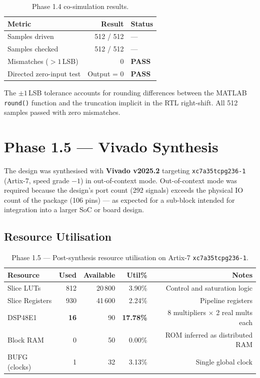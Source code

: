 \documentclass[11pt,a4paper]{article}
\begin{document}
\begin{table}[H]
\centering
\begin{tabular}{lrl}
\toprule
\textbf{Metric} & \textbf{Result} & \textbf{Status} \\
\midrule
Samples driven          & 512 / 512  & --- \\
Samples checked         & 512 / 512  & --- \\
Mismatches ($>1$\,LSB)  & 0          & \textcolor{passgreen}{\textbf{PASS}} \\
Directed zero-input test & Output = 0 & \textcolor{passgreen}{\textbf{PASS}} \\
\bottomrule
\end{tabular}
\caption{Phase 1.4 co-simulation results.}
\end{table}

The $\pm1$\,LSB tolerance accounts for rounding differences between the
MATLAB \texttt{round()} function and the truncation implicit in the RTL
right-shift. All 512 samples passed with zero mismatches.

\section{Phase 1.5 --- Vivado Synthesis}

The design was synthesised with \textbf{Vivado v2025.2} targeting
\texttt{xc7a35tcpg236-1} (Artix-7, speed grade $-1$) in out-of-context mode.
Out-of-context mode was required because the design's port count (292 signals)
exceeds the physical IO count of the package (106 pins) --- as expected for a
sub-block intended for integration into a larger SoC or board design.

\subsection{Resource Utilisation}

\begin{table}[H]
\centering
\begin{tabular}{lrrrr}
\toprule
\textbf{Resource} & \textbf{Used} & \textbf{Available} & \textbf{Util\%} & \textbf{Notes} \\
\midrule
Slice LUTs      & 812  & 20\,800 & 3.90\%  & Control and saturation logic \\
Slice Registers & 930  & 41\,600 & 2.24\%  & Pipeline registers \\
DSP48E1         & \textbf{16}   & 90      & \textbf{17.78\%} & 8 multipliers $\times$ 2 real mults each \\
Block RAM       & 0    & 50      & 0.00\%  & ROM inferred as distributed RAM \\
BUFG (clocks)   & 1    & 32      & 3.13\%  & Single global clock \\
\bottomrule
\end{tabular}
\caption{Phase 1.5 --- Post-synthesis resource utilisation on Artix-7
         \texttt{xc7a35tcpg236-1}.}
\end{table}
\end{document}
